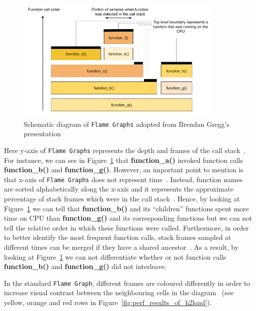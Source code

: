 \documentclass[12pt,a4paper,twoside,openright]{report}
\begin{document}
    \begin{figure}[H]
    \centering
    \includegraphics[width=0.9\textwidth]{figs/Flame_Graphs_explanation.png}
    \caption[Schematic diagram of \texttt{Flame Graphs}]{Schematic diagram of \texttt{Flame Graphs} adopted from Brendan Gregg's presentation~\cite{USENIX_ATC2017_flamegraphs}}
    \label{fig:Flame_Graphs_explanation}
    \end{figure}

Here y-axis of \texttt{Flame Graphs} represents the depth and frames of the call stack~\cite{CPU_Flame_graphs}.
For instance, we can see in Figure~\ref{fig:Flame_Graphs_explanation} that \textbf{function\_a()} invoked function calls \textbf{function\_b()} and \textbf{function\_g()}. 
However, an important point to mention is that x-axis of \texttt{Flame Graphs} does not represent time~\cite{CPU_Flame_graphs}.
Instead, function names are sorted alphabetically along the x-axis and it represents the approximate percentage of stack frames which were in the call stack~\cite{CPU_Flame_graphs}.
Hence, by looking at Figure~\ref{fig:Flame_Graphs_explanation} we can tell that \textbf{function\_b()} and its \enquote{children} functions spent more time on CPU than \textbf{function\_g()} and its corresponding functions but we can not tell the relative order in which these functions were called.
Furthermore, in order to better identify the most frequent function calls, stack frames sampled at different times can be merged if they have a shared ancestor~\cite{CPU_Flame_graphs}.
As a result, by looking at Figure~\ref{fig:Flame_Graphs_explanation} we can not differentiate whether or not function calls \textbf{function\_b()} and \textbf{function\_g()} did not interleave.

In the standard \texttt{Flame Graph}, different frames are coloured differently in order to increase visual contrast between the neighbouring cells in the diagram~\cite{CPU_Flame_graphs} (see yellow, orange and red rows in Figure~\ref{fig:perf_results_of_h2load}).
\end{document}
